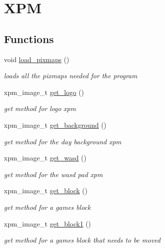 \hypertarget{group__XPM}{}\section{X\+PM}
\label{group__XPM}
\subsection*{Functions}
\begin{DoxyCompactItemize}
\item 
void \hyperlink{group__XPM_gad2044d84c92e452614c589961960e3f2}{load\+\_\+pixmaps} ()
\begin{DoxyCompactList}\small\item\em loads all the pixmaps needed for the program \end{DoxyCompactList}\item 
xpm\+\_\+image\+\_\+t \hyperlink{group__XPM_ga7e3ffa96f2cef7445fadb7a3da526d2f}{get\+\_\+logo} ()
\begin{DoxyCompactList}\small\item\em get method for logo xpm \end{DoxyCompactList}\item 
xpm\+\_\+image\+\_\+t \hyperlink{group__XPM_ga2fc6c9c4a09c9d990267ef2e961e133b}{get\+\_\+background} ()
\begin{DoxyCompactList}\small\item\em get method for the day background xpm \end{DoxyCompactList}\item 
xpm\+\_\+image\+\_\+t \hyperlink{group__XPM_ga8e0a9d2b45c84727a634b6aaf1be79f3}{get\+\_\+wasd} ()
\begin{DoxyCompactList}\small\item\em get method for the wasd pad xpm \end{DoxyCompactList}\item 
xpm\+\_\+image\+\_\+t \hyperlink{group__XPM_ga55abea20b97f7d2ba8c63a69ff86d18b}{get\+\_\+block} ()
\begin{DoxyCompactList}\small\item\em get method for a game\textquotesingle{}s block \end{DoxyCompactList}\item 
xpm\+\_\+image\+\_\+t \hyperlink{group__XPM_gaa8e536961c0ed7f1bcd089ae9fb0c4c7}{get\+\_\+block1} ()
\begin{DoxyCompactList}\small\item\em get method for a game\textquotesingle{}s block that needs to be moved \end{DoxyCompactList}\item 

\end{DoxyCompactItemize}
